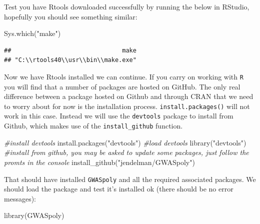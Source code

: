 \documentclass[
]{book}
\newenvironment{Shaded}{\begin{snugshade}}{\end{snugshade}}
\newcommand{\CommentTok}[1]{\textcolor[rgb]{0.56,0.35,0.01}{\textit{#1}}}
\newcommand{\FunctionTok}[1]{\textcolor[rgb]{0.00,0.00,0.00}{#1}}
\newcommand{\NormalTok}[1]{#1}
\newcommand{\StringTok}[1]{\textcolor[rgb]{0.31,0.60,0.02}{#1}}
\begin{document}
Test you have Rtools downloaded successfully by running the below in RStudio, hopefully you should see something similar:

\begin{Shaded}
\begin{Highlighting}[]
\FunctionTok{Sys.which}\NormalTok{(}\StringTok{"make"}\NormalTok{)}
\end{Highlighting}
\end{Shaded}

\begin{verbatim}
##                               make 
## "C:\\rtools40\\usr\\bin\\make.exe"
\end{verbatim}

Now we have Rtools installed we can continue. If you carry on working with \texttt{R} you will find that a number of packages are hosted on GitHub. The only real difference between a package hosted on Github and through CRAN that we need to worry about for now is the installation process. \texttt{install.packages()} will not work in this case. Instead we will use the \texttt{devtools} package to install from Github, which makes use of the \texttt{install\_github} function.

\begin{Shaded}
\begin{Highlighting}[]
\CommentTok{\#install devtools}
\FunctionTok{install.packages}\NormalTok{(}\StringTok{"devtools"}\NormalTok{) }
\CommentTok{\#load devtools}
\FunctionTok{library}\NormalTok{(}\StringTok{"devtools"}\NormalTok{)}
\CommentTok{\#install from github, you may be asked to update some packages, just follow the promts in the console}
\FunctionTok{install\_github}\NormalTok{(}\StringTok{"jendelman/GWASpoly"}\NormalTok{)}
\end{Highlighting}
\end{Shaded}

That should have installed \texttt{GWASpoly} and all the required associated packages. We should load the package and test it's installed ok (there should be no error messages):

\begin{Shaded}
\begin{Highlighting}[]
\FunctionTok{library}\NormalTok{(GWASpoly)}
\end{Highlighting}
\end{Shaded}
\end{document}

